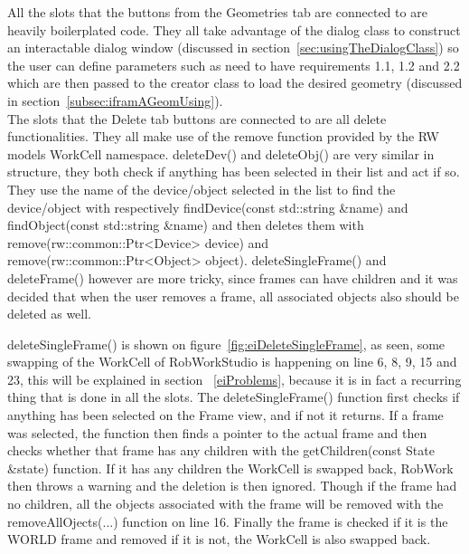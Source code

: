 All the slots that the buttons from the Geometries tab are connected to are heavily boilerplated code. They all take advantage of the dialog class to construct an interactable dialog window (discussed in section~\ref{sec:usingTheDialogClass}) so the user can define parameters such as need to have requirements 1.1, 1.2 and 2.2 which are then passed to the creator class to load the desired geometry (discussed in section~\ref{subsec:iframAGeomUsing}).\\

The slots that the Delete tab buttons are connected to are all delete functionalities. They all make use of the remove function provided by the RW models WorkCell namespace. deleteDev() and deleteObj() are very similar in structure, they both check if anything has been selected in their list and act if so. They use the name of the device/object selected in the list to find the device/object with respectively findDevice(const std::string \&name) and findObject(const std::string \&name) and then deletes them with remove(rw::common::Ptr<Device> device) and remove(rw::common::Ptr<Object> object).
deleteSingleFrame() and deleteFrame() however are more tricky, since frames can have children and it was decided that when the user removes a frame, all associated objects also should be deleted as well.

deleteSingleFrame() is shown on figure~\ref{fig:eiDeleteSingleFrame}, as seen, some swapping of the WorkCell of RobWorkStudio is happening on line 6, 8, 9, 15 and 23, this will be explained in section ~\ref{eiProblems}, because it is in fact a recurring thing that is done in all the slots.
The deleteSingleFrame() function first checks if anything has been selected on the Frame view, and if not it returns. If a frame was selected, the function then finds a pointer to the actual frame and then checks whether that frame has any children with the getChildren(const State \&state) function. If it has any children the WorkCell is swapped back, RobWork then throws a warning and the deletion is then ignored. Though if the frame had no children, all the objects associated with the frame will be removed with the removeAllOjects(...) function on line 16. Finally the frame is checked if it is the WORLD frame and removed if it is not, the WorkCell is also swapped back.

